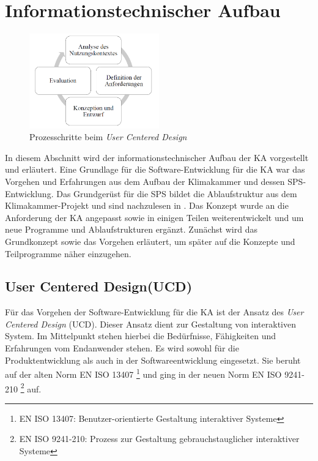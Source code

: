 \section{Informationstechnischer Aufbau}
\label{sec:Informationstechnischer Aufbau}

\begin{figure}[htb]
\centering		\includegraphics[width=0.50\textwidth]{Pictures/UCD.png}
\caption{Prozesschritte beim \textit{User Centered Design} \citep{Nuerenberg2015}}
\label{fig:}
\end{figure}

In diesem Abschnitt wird der informationstechnischer Aufbau der KA vorgestellt und erläutert. Eine Grundlage für die Software-Entwicklung für die KA war das Vorgehen und Erfahrungen aus dem Aufbau der Klimakammer und dessen SPS-Entwicklung. Das Grundgerüst für die SPS bildet die Ablaufstruktur aus dem Klimakammer-Projekt und sind nachzulesen in \textsc{\citeauthor{Nuerenberg2015}}. Das Konzept wurde an die Anforderung der KA angepasst sowie in einigen Teilen weiterentwickelt und um neue Programme und Ablaufstrukturen ergänzt. Zunächst wird das Grundkonzept sowie das Vorgehen erläutert, um später auf die Konzepte und Teilprogramme näher einzugehen. 

\subsection{User Centered Design(UCD)}
\label{subsec: UCD}

Für das Vorgehen der Software-Entwicklung für die KA ist der Ansatz des \textit{User Centered Design} (UCD). Dieser Ansatz dient zur Gestaltung von interaktiven System. Im Mittelpunkt stehen hierbei die Bedürfnisse, Fähigkeiten und Erfahrungen vom Endanwender stehen. Es wird sowohl für die Produktentwicklung als auch in der Softwareentwicklung eingesetzt. Sie beruht auf der alten Norm  EN ISO 13407 \footnote{EN ISO 13407: Benutzer-orientierte Gestaltung interaktiver Systeme} und ging in der neuen Norm EN ISO 9241-210 \footnote{EN ISO 9241-210: Prozess zur Gestaltung gebrauchstauglicher interaktiver Systeme}  auf. \citep{Normung2010}

